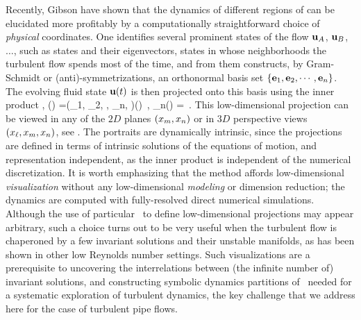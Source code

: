 Recently, Gibson \etal{} have shown that the dynamics of different regions
of {\statesp} can be elucidated more profitably by a computationally
straight\-forward choice of \emph{physical} coordinates. One identifies
several prominent states of the flow ${\bf u}_A$, ${\bf u}_B$, $\dots$, such as
{\eqv} states and their eigenvectors, states in whose neighborhoods the
turbulent flow spends most of the time, and from them constructs, by
Gram-Schmidt or (anti)-symmetrizations, an orthonormal basis set
$\{{\bf e}_1, {\bf e}_2, \cdots, {\bf e}_n\}$. The evolving fluid state ${\bf u}(t)$
is then projected onto this basis using the inner product
,
\beq
\ssp(\zeit) =(\ssp_1, \ssp_2, \cdots, \ssp_n, \cdots)(\zeit)
    \,,\qquad
\ssp_n(\zeit) = 
\,.
This low-dimensional projection can be viewed in any of the $2D$ planes
$(\ssp_m, \ssp_n)$ or in $3D$ perspective views $(\ssp_{\ell},\ssp_m,
\ssp_n)$, see . The {\stateDsp} portraits are
{dynamically intrinsic}, since the projections are defined in terms of
intrinsic solutions of the equations of motion, and {representation
independent}, as the inner product  is independent of
the numerical discretization. It is worth emphasizing that the method
affords low-dimensional {\em visualization} without any low-dimensional
{\em modeling} or dimension reduction; the dynamics are computed with
fully-resolved direct numerical simulations. Although the use of
particular \reqva\ to define low-dimensional projections
may appear arbitrary, such a choice turns out to be
very useful when the turbulent flow is chaperoned by a few invariant
solutions and their unstable manifolds, as has been shown in other low
Reynolds number settings. Such visualizations are a
prerequisite to uncovering the interrelations between (the infinite
number of) invariant solutions, and constructing symbolic dynamics
partitions of \statesp\ needed for a systematic exploration of turbulent
dynamics, the key challenge that we address here for the case of turbulent
pipe flows.

\renewcommand{\ssp}{x}

